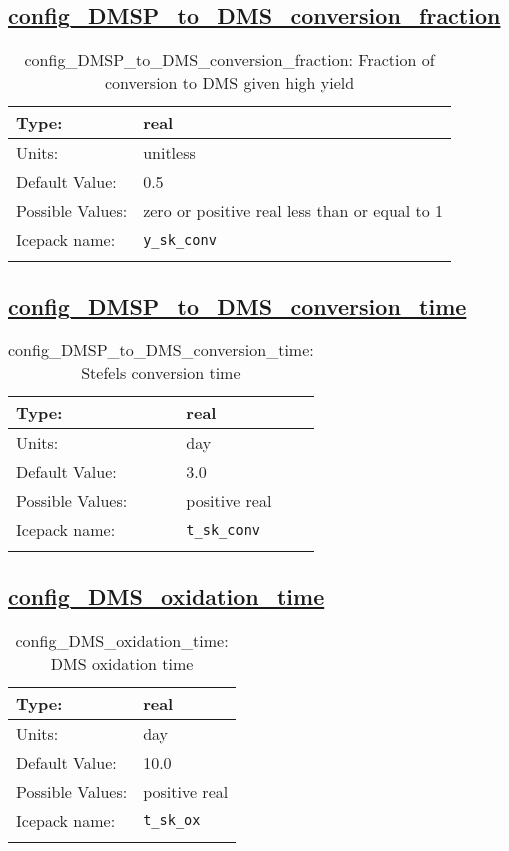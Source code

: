 \subsection[config\_DMSP\_to\_DMS\_conversion\_fraction]{\hyperref[sec:nm_tab_biogeochemistry]{config\_DMSP\_to\_DMS\_conversion\_fraction}}
\label{subsec:nm_sec_config_DMSP_to_DMS_conversion_fraction}
\begin{center}
\begin{longtable}{| p{2.0in} || p{4.0in} |}
    \hline
    Type: & real \\
    \hline
    Units: & \si{unitless} \\
    \hline
    Default Value: & 0.5 \\
    \hline
    Possible Values: & zero or positive real less than or equal to 1 \\
    \hline
    Icepack name: & \verb+y_sk_conv+ \\
    \hline
    \caption{config\_DMSP\_to\_DMS\_conversion\_fraction: Fraction of conversion to DMS given high yield}
\end{longtable}
\end{center}
\subsection[config\_DMSP\_to\_DMS\_conversion\_time]{\hyperref[sec:nm_tab_biogeochemistry]{config\_DMSP\_to\_DMS\_conversion\_time}}
\label{subsec:nm_sec_config_DMSP_to_DMS_conversion_time}
\begin{center}
\begin{longtable}{| p{2.0in} || p{4.0in} |}
    \hline
    Type: & real \\
    \hline
    Units: & \si{day} \\
    \hline
    Default Value: & 3.0 \\
    \hline
    Possible Values: & positive real \\
    \hline
    Icepack name: & \verb+t_sk_conv+ \\
    \hline
    \caption{config\_DMSP\_to\_DMS\_conversion\_time: Stefels conversion time}
\end{longtable}
\end{center}
\subsection[config\_DMS\_oxidation\_time]{\hyperref[sec:nm_tab_biogeochemistry]{config\_DMS\_oxidation\_time}}
\label{subsec:nm_sec_config_DMS_oxidation_time}
\begin{center}
\begin{longtable}{| p{2.0in} || p{4.0in} |}
    \hline
    Type: & real \\
    \hline
    Units: & \si{day} \\
    \hline
    Default Value: & 10.0 \\
    \hline
    Possible Values: & positive real \\
    \hline
    Icepack name: & \verb+t_sk_ox+ \\
    \hline
    \caption{config\_DMS\_oxidation\_time: DMS oxidation time}
\end{longtable}
\end{center}
